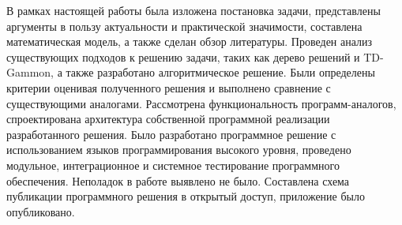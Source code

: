 В рамках настоящей работы была изложена постановка задачи, представлены аргументы в пользу актуальности и практической значимости, составлена математическая модель, а также сделан обзор литературы. Проведен анализ существующих подходов к решению задачи, таких как дерево решений и TD-Gammon, а также разработано алгоритмическое решение. Были определены критерии оценивая полученного решения и выполнено сравнение с существующими аналогами. Рассмотрена функциональность программ-аналогов, спроектирована архитектура собственной программной реализации разработанного решения. Было разработано программное решение с использованием языков программирования высокого уровня, проведено модульное, интеграционное и системное тестирование программного обеспечения. Неполадок в работе выявлено не было. Составлена схема публикации программного решения в открытый доступ, приложение было опубликовано.
